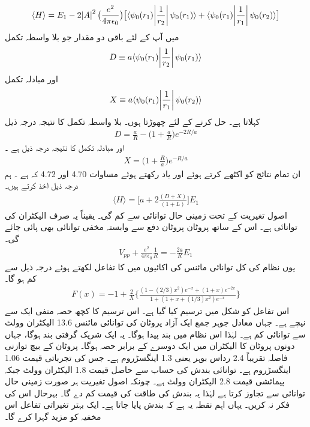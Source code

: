 \begin{align}
\langle H \rangle =E_{1}-2\abs{A}^{2}\big(\frac{e^{2}}{4\pi\epsilon_{0}}\big)\big[\langle \psi_{0}(r_{1})\abs{\frac{1}{r_{2}}}\psi_{0}(r_{1})\rangle +\langle \psi_{0}(r_{1})\abs{\frac{1}{r_{1}}}\psi_{0}(r_{2})\rangle\big]
\end{align}
 میں آپ کے لئے باقی دو مقدار جو بلا واسطہ تکمل 
\begin{align}
D\equiv a\langle \psi_{0}(r_{1})\abs{\frac{1}{r_{2}}}\psi_{0}(r_{1})\rangle
\end{align}
 اور
مبادلہ تکمل 
\begin{align}
X\equiv a\langle\psi_{0}(r_{1})\abs{\frac{1}{r_{1}}}\psi_{0}(r_{2})\rangle
\end{align}
 کہلاتا ہے۔ حل کرنے کے لئے چھوڑتا ہوں۔ بلا واسطہ تکمل کا نتیجہ درجہ ذیل 
\begin{align}
D=\frac{a}{R}-\big(1+\frac{a}{R}\big)e^{-2R/a} 
\end{align}
 اور مبادلہ تکمل کا نتیجہ درجہ ذیل ہے ۔ 
\begin{align}
X=\big(1+\frac{R}{a}\big)e^{-R/a} 
\end{align}
 ان تمام نتائج کو اکٹھے کرتے ہوئے اور یاد رکھتے ہوئے مساوات 4.70 اور 4.72 کہ   ہے ۔ ہم درجہ ذیل اخذ کرتے ہیں۔
\begin{align}
\langle H \rangle =\big[a+2\frac{(D+X)}{(1+L)}\big]E_{1} 
\end{align}
 اصول تغیریت کے تحت زمینی حال توانائی    سے کم گی۔ یقیناً یہ صرف الیکٹران کی توانائی ہے۔ اس کے ساتھ پروٹان پروٹان دفع سے وابستہ مخفی توانائی بھی پائی جائے گی۔
\begin{align}
V_{pp}+\frac{e^{2}}{4\pi\epsilon_{0}}\frac{1}{R}=-\frac{2a}{R}E_{1} 
\end{align}
 یوں نظام کی کل توانائی مائنس   کی اکائیوں میں     کا تفاعل لکھتے ہوئے درجہ ذیل سے کم ہو گا۔
 \begin{align}
F(x)=-1+\frac{2}{X}\big\{\frac{(1-(2/3)x^{2})e^{-x}+(1+x)e^{-2x}}{1+(1+x+(1/3)x^{2})e^{-x}}\big\} 
\end{align}
 اس تفاعل کو شکل   میں ترسیم کیا گیا ہے۔ اس ترسیم کا کچھ حصہ منفی ایک سے نیچے ہے۔ جہاں معادل جوہر جمع ایک آزاد پروٹان کی توانائی مائنس 13.6 الیکٹران وولٹ سے توانائی کم ہے۔ لہٰذا اس نظام میں بند پیدا ہوگا۔ یہ ایک شریک گرفتی بند ہوگا، جہاں دونوں پروٹان کا الیکٹران میں ایک دوسرے کے برابر حصہ ہوگا۔ پروٹان کے بیچ توازنی فاصلہ تقریباً 2.4 رداس بوہر یعنی 1.3  اینگسڑروم ہے۔ جس کی تجرباتی قیمت 1.06 اینگسڑروم ہے۔ توانائی بندش کی حساب سے حاصل قیمت 1.8 الیکٹران وولٹ جبکہ پیمائشی قیمت 2.8 الیکٹران وولٹ ہے۔ چونکہ اصول تغیریت ہر صورت زمینی حال توانائی سے تجاوز کرتا ہے لہٰذا یہ بندش کی طاقت کی قیمت کم دے گا۔ بہرحال اس کی فکر نہ کریں۔ یہاں اہم نقطہ یہ  ہے کہ بندش پایا جاتا ہے۔ ایک بہتر تغیراتی تفاعل اس مخفیہ کو مزید گہرا کرے گا۔ 
